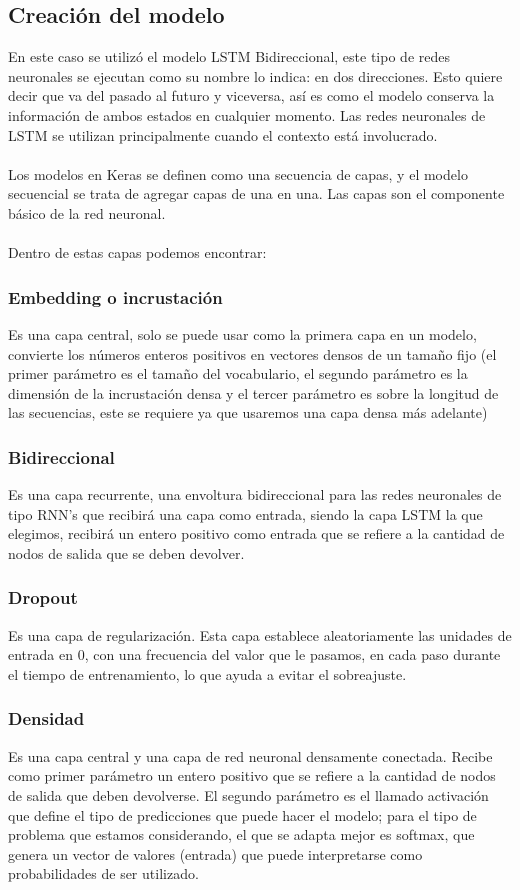 \subsection{Creación del modelo}
En este caso se utilizó el modelo LSTM Bidireccional, este tipo de redes neuronales se ejecutan como su nombre lo indica: en dos direcciones. Esto quiere decir que va del pasado al futuro y viceversa, así es como el modelo conserva la información de ambos estados en cualquier momento. Las redes neuronales de LSTM se utilizan principalmente cuando el contexto está involucrado.\\\\
Los modelos en Keras se definen como una secuencia de capas, y el modelo secuencial se trata de agregar capas de una en una. Las capas son el componente básico de la red neuronal.\\\\
Dentro de estas capas podemos encontrar:
\subsubsection{Embedding o incrustación}
Es una capa central, solo se puede usar como la primera capa en un modelo, convierte los números enteros positivos en vectores densos de un tamaño fijo (el primer parámetro es el tamaño del vocabulario, el segundo parámetro es la dimensión de la incrustación densa y el tercer parámetro es sobre la longitud de las secuencias, este se requiere ya que usaremos una capa densa más adelante)
\subsubsection{Bidireccional}
Es una capa recurrente, una envoltura bidireccional para las redes neuronales de tipo RNN's que recibirá una capa como entrada, siendo la capa LSTM la que elegimos, recibirá un entero positivo como entrada que se refiere a la cantidad de nodos de salida que se deben devolver.
\subsubsection{Dropout}
Es una capa de regularización. Esta capa establece aleatoriamente las unidades de entrada en 0, con una frecuencia del valor que le pasamos, en cada paso durante el tiempo de entrenamiento, lo que ayuda a evitar el sobreajuste.
\subsubsection{Densidad}
Es una capa central y una capa de red neuronal densamente conectada. Recibe como primer parámetro un entero positivo que se refiere a la cantidad de nodos de salida que deben devolverse. El segundo parámetro es el llamado activación que define el tipo de predicciones que puede hacer el modelo; para el tipo de problema que estamos considerando, el que se adapta mejor es softmax, que genera un vector de valores (entrada) que puede interpretarse como probabilidades de ser utilizado.
